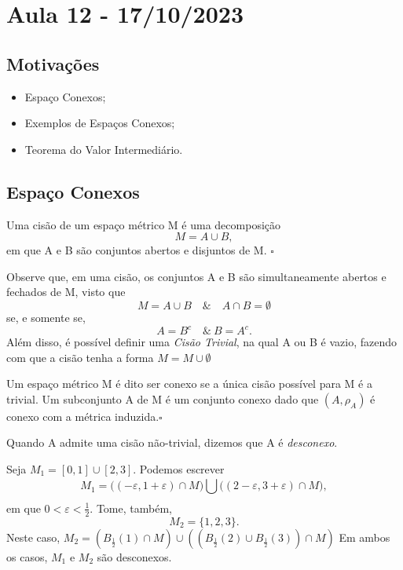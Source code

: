 \documentclass[metric_notes.tex]{subfiles}
\begin{document}
\section{Aula 12 - 17/10/2023}
\subsection{Motivações}
\begin{itemize}
	\item Espaço Conexos;
	\item Exemplos de Espaços Conexos;
	\item Teorema do Valor Intermediário.
\end{itemize}
\subsection{Espaço Conexos}
\begin{def*}
	Uma cisão de um espaço métrico M é uma decomposição
	\[
		M = A\cup{B},
	\]
	em que A e B são conjuntos abertos e disjuntos de M. \(\square\)
\end{def*}
Observe que, em uma cisão, os conjuntos A e B são simultaneamente abertos e fechados
de M, visto que
\[
	M = A\cup B\quad\&\quad A\cap B = \emptyset
\]
se, e somente se,
\[
	A = B^{c} \quad\&\ B = A^{c}.
\]
Além disso, é possível definir uma \textit{Cisão Trivial}, na qual A ou B é vazio, fazendo com que
a cisão tenha a forma \(M = M\cup\emptyset\)
\begin{def*}
	Um espaço métrico M é dito ser conexo se a única cisão possível para M é a trivial. Um
	subconjunto A de M é um conjunto conexo dado que \((A, \rho_{A})\) é conexo com a métrica induzida.\(\square\)
\end{def*}
Quando A admite uma cisão não-trivial, dizemos que A é \textit{desconexo}.
\begin{example}
	Seja \(M_{1} = [0,1]\cup [2, 3]\). Podemos escrever
	\[
		M_{1} = \biggl((-\varepsilon , 1 + \varepsilon )\cap M\biggr)\bigcup_{}^{}{\biggl((2-\varepsilon , 3+\varepsilon )\cap M\biggr)},
	\]
	em que \(0 < \varepsilon < \frac{1}{2}.\) Tome, também,
	\[
		M_{2} = \{1, 2, 3\}.
	\]
	Neste caso, \(M_{2} = (B_{\frac{1}{2}}(1)\cap M)\cup ((B_{\frac{1}{2}}(2)\cup B_{\frac{1}{2}}(3))\cap M)\)
	Em ambos os casos, \(M_{1}\) e \(M_{2}\) são desconexos.
\end{example}
\end{document}
